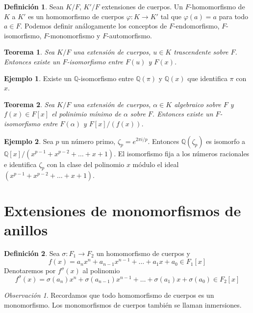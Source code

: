 \documentclass{report}
\newtheorem{theorem}{Teorema}[chapter]
\theoremstyle{remark}
\newtheorem*{remark}{Observación}
\theoremstyle{definition}
\newtheorem{definition}{Definición}[chapter]
\theoremstyle{definition}
\theoremstyle{definition}
\newtheorem*{example}{Ejemplo}
\begin{document}
\begin{definition}
    Sean $K/F$, $K'/F$ extensiones de cuerpos.
    Un $F$-homomorfismo de $K$ a $K'$ es un homomorfismo de cuerpos $\varphi : K \to K'$ tal que $\varphi(a) = a$ para todo $a \in F$.
    Podemos definir análogamente los conceptos de $F$-endomorfismo, $F$-isomorfismo, $F$-monomorfismo y $F$-automorfismo.
\end{definition}

\begin{theorem}
    Sea $K/F$ una extensión de cuerpos, $u \in K$ trascendente sobre $F$. Entonces existe un $F$-isomorfismo entre $F(u)$ y $F(x)$.
\end{theorem}

\begin{example}
    Existe un $\mathbb{Q}$-isomorfismo entre $\mathbb{Q}(\pi)$ y $\mathbb{Q}(x)$ que identifica $\pi$ con $x$.
\end{example}

\begin{theorem}
    Sea $K/F$ una extensión de cuerpos, $\alpha \in K$ algebraico sobre $F$ y $f(x) \in F[x]$ el polinimio mínimo de $\alpha$ sobre $F$. Entonces existe un $F$-isomorfismo entre $F(\alpha)$ y $F[x]/(f(x))$.
\end{theorem}

\begin{example}
    Sea $p$ un número primo, $\zeta_p = e^{2\pi i / p}$.
    Entonces $\mathbb{Q}(\zeta_p)$ es isomorfo a $\mathbb{Q}[x]/(x^{p-1} + x^{p-2} + \dots + x + 1)$.
    El isomorfismo fija a los números racionales e identifica $\zeta_p$ con la clase del polinomio $x$ módulo el ideal $(x^{p-1} + x^{p-2} + \dots + x + 1)$.
\end{example}

\section{Extensiones de monomorfismos de anillos}

\begin{definition}
    Sea $\sigma : F_1 \to F_2$ un homomorfismo de cuerpos y
    $$f(x) = a_nx^n + a_{n-1}x^{n-1} + \dots + a_1x + a_0 \in F_1[x]$$
    Denotaremos por $f^\sigma(x)$ al polinomio
    $$f^\sigma(x) = \sigma(a_n)x^n + \sigma(a_{n-1})x^{n-1} + \dots + \sigma(a_1)x + \sigma(a_0) \in F_2[x]$$
\end{definition}

\begin{remark}
    Recordamos que todo homomorfismo de cuerpos es un monomorfismo.
    Los monomorfismos de cuerpos también se llaman inmersiones.
\end{remark}
\end{document}
